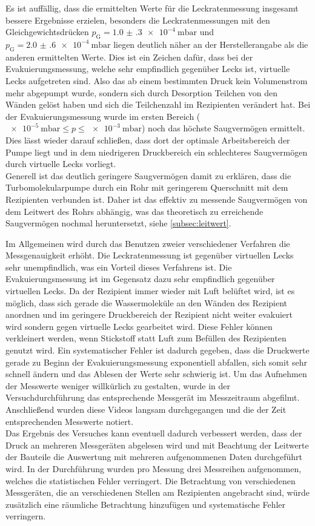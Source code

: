 \noindent Es ist auffällig, dass die ermittelten Werte für die Leckratenmessung insgesamt bessere Ergebnisse erzielen, besonders die Leckratenmessungen
mit den Gleichgewichtsdrücken $p_\text{G} = \SI{1.0(3)e-4}{\milli\bar}$ und $p_\text{G} = \SI{2.0(6)e-4}{\milli\bar}$ liegen deutlich näher an der Herstellerangabe als die anderen ermittelten Werte. 
Dies ist ein Zeichen dafür, dass bei der Evakuierungsmessung, welche sehr empfindlich gegenüber Lecks ist, virtuelle Lecks aufgetreten sind. Also das ab einem bestimmten Druck 
kein Volumenstrom mehr abgepumpt wurde, sondern sich durch Desorption Teilchen von den Wänden gelöst haben und sich die Teilchenzahl im Rezipienten verändert hat.
Bei der Evakuierungsmessung wurde im ersten Bereich ($\SI{e-5}{\milli\bar} \leq p \leq \SI{e-3}{\milli\bar}$) noch das höchste Saugvermögen ermittelt.
Dies lässt wieder darauf schließen, dass dort der optimale Arbeitsbereich der Pumpe liegt und in dem niedrigeren Druckbereich ein schlechteres Saugvermögen durch virtuelle Lecks vorliegt. \\
Generell ist das deutlich geringere Saugvermögen damit zu erklären, dass die Turbomolekularpumpe durch ein Rohr mit geringerem Querschnitt mit dem Rezipienten verbunden ist. Daher ist das 
effektiv zu messende Saugvermögen von dem Leitwert des Rohrs abhängig, was das theoretisch zu erreichende Saugvermögen nochmal heruntersetzt, siehe \autoref{subsec:leitwert}. 

\noindent Im Allgemeinen wird durch das Benutzen zweier verschiedener Verfahren die Messgenauigkeit erhöht. Die Leckratenmessung ist gegenüber virtuellen Lecks sehr unempfindlich, was 
ein Vorteil dieses Verfahrens ist. 
Die Evakuierungsmessung ist im Gegensatz dazu sehr empfindlich gegenüber virtuellen Lecks. Da der Rezipient immer wieder mit Luft belüftet wird, ist es möglich, dass sich gerade die Wassermoleküle 
an den Wänden des Rezipient anordnen und im geringere Druckbereich der Rezipient nicht weiter evakuiert wird sondern gegen virtuelle Lecks gearbeitet wird. 
Diese Fehler können verkleinert werden, wenn Stickstoff statt Luft zum Befüllen des Rezipienten genutzt wird. 
Ein systematischer Fehler ist dadurch gegeben, dass die Druckwerte gerade zu Beginn der Evakuierungsmessung exponentiell abfallen, sich somit sehr schnell ändern und das Ablesen der Werte 
sehr schwierig ist. Um das Aufnehmen der Messwerte weniger willkürlich zu gestalten, wurde in der Versuchdurchführung das entsprechende Messgerät im Messzeitraum abgefilmt. Anschließend 
wurden diese Videos langsam durchgegangen und die der Zeit entsprechenden Messwerte notiert. \\
Das Ergebnis des Versuches kann eventuell dadurch verbessert werden, dass der Druck an mehreren Messgeräten abgelesen wird und mit Beachtung der Leitwerte der Bauteile die Auswertung mit 
mehreren aufgenommenen Daten durchgeführt wird. In der Durchführung wurden pro Messung drei Messreihen aufgenommen, welches die statistischen Fehler verringert. Die Betrachtung von 
verschiedenen Messgeräten, die an verschiedenen Stellen am Rezipienten angebracht sind, würde zusätzlich eine räumliche Betrachtung hinzufügen und systematische Fehler verringern. 

